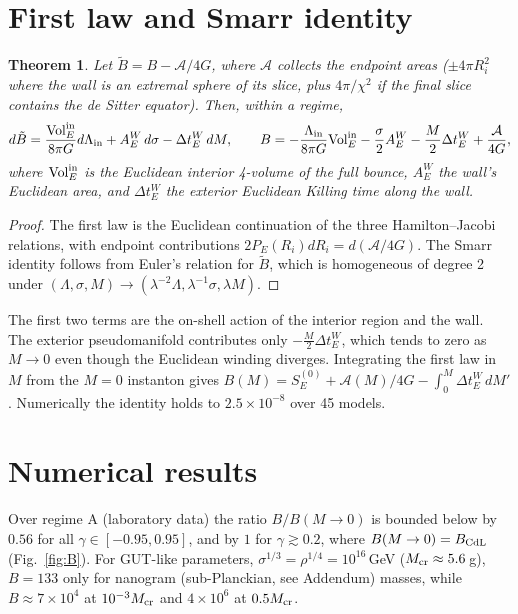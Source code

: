 \documentclass[11pt,a4paper]{article}
\newtheorem{theorem}{Theorem}
\theoremstyle{remark}\newtheorem{remark}[theorem]{Remark}
\begin{document}
\section{First law and Smarr identity}\label{sec:smarr}
\begin{theorem}\label{thm:smarr}
Let $\tilde B=B-\mathcal A/4G$, where $\mathcal A$ collects the endpoint areas ($\pm4\pi R_i^2$ where the wall is an extremal sphere of
its slice, plus $4\pi/\chi^2$ if the final slice contains the de Sitter equator). Then, within a regime,
\begin{equation}
d\tilde B=\frac{{\rm Vol}^{\rm in}_E}{8\pi G}d\Lambda_{\rm in}+A^W_E\,d\sigma-\Delta t^W_E\,dM,\qquad
B=-\frac{\Lambda_{\rm in}}{8\pi G}{\rm Vol}^{\rm in}_E-\frac\sigma2A^W_E-\frac M2\Delta t^W_E+\frac{\mathcal A}{4G},
\end{equation}
where ${\rm Vol}^{\rm in}_E$ is the Euclidean interior 4-volume of the full bounce, $A^W_E$ the wall's Euclidean area, and
$\Delta t^W_E$ the exterior Euclidean Killing time along the wall.
\end{theorem}
\begin{proof}
The first law is the Euclidean continuation of the three Hamilton--Jacobi relations, with endpoint contributions
$2P_E(R_i)dR_i=d(\mathcal A/4G)$. The Smarr identity follows from Euler's relation for $\tilde B$, which is homogeneous of degree 2
under $(\Lambda,\sigma,M)\to(\lambda^{-2}\Lambda,\lambda^{-1}\sigma,\lambda M)$.
\end{proof}
The first two terms are the on-shell action of the interior region and the wall. The exterior pseudomanifold
contributes only $-\frac M2\Delta t^W_E$, which tends to zero as $M\to0$ even though the Euclidean winding diverges.
Integrating the first law in $M$ from the $M=0$ instanton gives $B(M)=S_E^{(0)}+\mathcal A(M)/4G-\int_0^M\Delta t^W_E\,dM'$.
Numerically the identity holds to $2.5\times10^{-8}$ over 45 models.

\section{Numerical results}\label{sec:num}
Over regime A (laboratory data) the ratio $B/B(M\to0)$ is bounded below by $0.56$ for all $\gamma\in[-0.95,0.95]$, and by $1$
for $\gamma\gtrsim0.2$, where $B(M\to0)=B_{\rm CdL}$ (Fig.~\ref{fig:B}). For GUT-like parameters,
$\sigma^{1/3}=\rho^{1/4}=10^{16}$\,GeV ($M_{\rm cr}\approx5.6$\,g), $B=133$ only for nanogram (sub-Planckian, see Addendum) masses, while $B\approx7\times10^4$ at
$10^{-3}M_{\rm cr}$ and $4\times10^6$ at $0.5M_{\rm cr}$.
\end{document}
